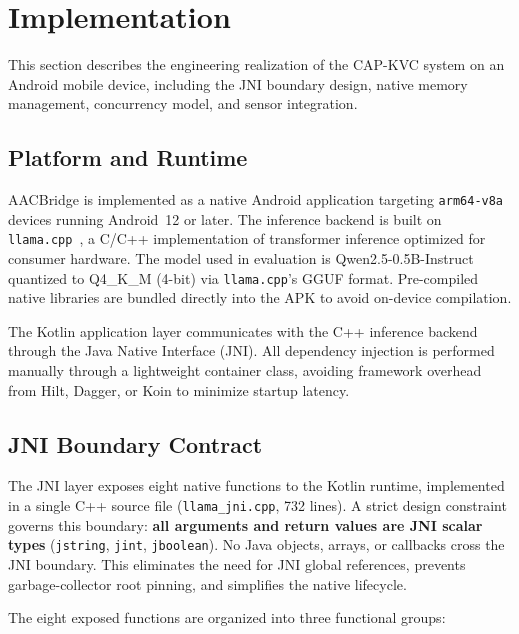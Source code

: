 \section{Implementation}
\label{sec:implementation}

This section describes the engineering realization of the CAP-KVC system on an Android mobile device, including the JNI boundary design, native memory management, concurrency model, and sensor integration.

\subsection{Platform and Runtime}
\label{sec:platform}

AACBridge is implemented as a native Android application targeting \texttt{arm64-v8a} devices running Android~12 or later. The inference backend is built on \texttt{llama.cpp}~\cite{llamacpp}, a C/C++ implementation of transformer inference optimized for consumer hardware. The model used in evaluation is Qwen2.5-0.5B-Instruct~\cite{qwen25} quantized to Q4\_K\_M (4-bit) via \texttt{llama.cpp}'s GGUF format. Pre-compiled native libraries are bundled directly into the APK to avoid on-device compilation.

The Kotlin application layer communicates with the C++ inference backend through the Java Native Interface (JNI). All dependency injection is performed manually through a lightweight container class, avoiding framework overhead from Hilt, Dagger, or Koin to minimize startup latency.

\subsection{JNI Boundary Contract}
\label{sec:jni}

The JNI layer exposes eight native functions to the Kotlin runtime, implemented in a single C++ source file (\texttt{llama\_jni.cpp}, 732 lines). A strict design constraint governs this boundary: \textbf{all arguments and return values are JNI scalar types} (\texttt{jstring}, \texttt{jint}, \texttt{jboolean}). No Java objects, arrays, or callbacks cross the JNI boundary. This eliminates the need for JNI global references, prevents garbage-collector root pinning, and simplifies the native lifecycle.

The eight exposed functions are organized into three functional groups:

